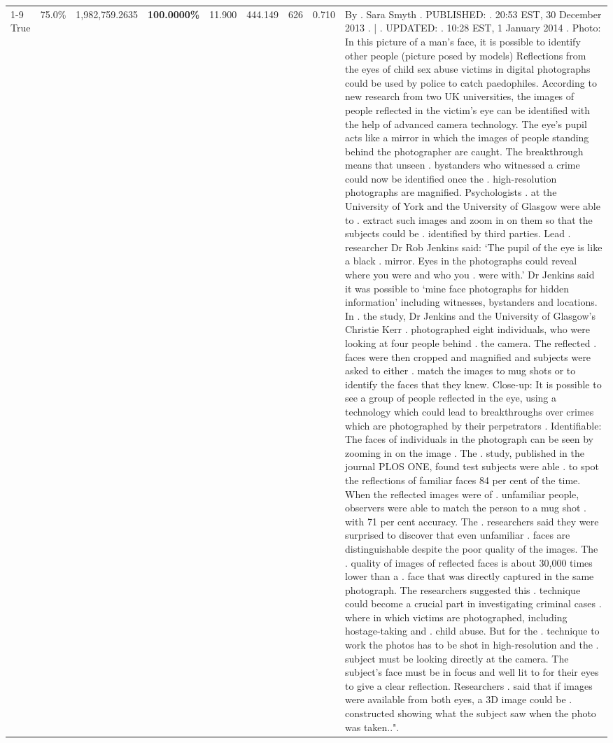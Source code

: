 \begin{table}[H]
\begin{tabular}{lllrlllll}
\cline{1-9}
True & 75.0\% & 1,982,759.2635 & \bfseries \color{red} 100.0000\% & 11.900 & 444.149 & 626 & 0.710 & By . Sara Smyth . PUBLISHED: . 20:53 EST, 30 December 2013 . | . UPDATED: . 10:28 EST, 1 January 2014 . Photo: In this picture of a man's face, it is possible to identify other people (picture posed by models) Reflections from the eyes of child sex abuse victims in digital photographs could be used by police to catch paedophiles. According to new research from two UK universities, the images of people reflected in the victim's eye can be identified with the help of advanced camera technology. The eye's pupil acts like a mirror in which the images of people standing behind the photographer are caught. The breakthrough means that unseen . bystanders who witnessed a crime could now be identified once the . high-resolution photographs are magnified. Psychologists . at the University of York and the University of Glasgow were able to . extract such images and zoom in on them so that the subjects could be . identified by third parties. Lead . researcher Dr Rob Jenkins said: ‘The pupil of the eye is like a black . mirror. Eyes in the photographs could reveal where you were and who you . were with.' Dr Jenkins said it was possible to ‘mine face photographs for hidden information' including witnesses, bystanders and locations. In . the study, Dr Jenkins and the University of Glasgow's Christie Kerr . photographed eight individuals, who were looking at four people behind . the camera. The reflected . faces were then cropped and magnified and subjects were asked to either . match the images to mug shots or to identify the faces that they knew. Close-up: It is possible to see a group of people reflected in the eye, using a technology which could lead to breakthroughs over crimes which are photographed by their perpetrators . Identifiable: The faces of individuals in the photograph can be seen by zooming in on the image . The . study, published in the journal PLOS ONE, found test subjects were able . to spot the reflections of familiar faces 84 per cent of the time. When the reflected images were of . unfamiliar people, observers were able to match the person to a mug shot . with 71 per cent accuracy. The . researchers said they were surprised to discover that even unfamiliar . faces are distinguishable despite the poor quality of the images. The . quality of images of reflected faces is about 30,000 times lower than a . face that was directly captured in the same photograph. The researchers suggested this . technique could become a crucial part in investigating criminal cases . where in which victims are photographed, including hostage-taking and . child abuse. But for the . technique to work the photos has to be shot in high-resolution and the . subject must be looking directly at the camera. The subject's face must be in focus and well lit to for their eyes to give a clear reflection. Researchers . said that if images were available from both eyes, a 3D image could be . constructed showing what the subject saw when the photo was taken..". \\

\end{tabular}
\end{table}
